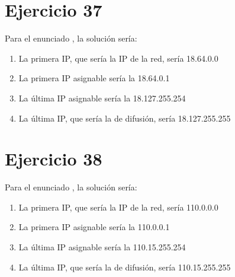 \documentclass[letterpaper,10pt,spanish]{sphinxmanual}
\begin{document}
\section{Ejercicio 37}
\label{\detokenize{t2_integracion_elementos/ejercicios_subredes_ipv4/rangos_direcciones:id37}}
\sphinxAtStartPar
Para el enunciado , la solución sería:
\begin{enumerate}
%
\item {} 
\sphinxAtStartPar
La primera IP, que sería la IP de la red, sería 18.64.0.0

\item {} 
\sphinxAtStartPar
La primera IP asignable sería la 18.64.0.1

\item {} 
\sphinxAtStartPar
La última IP asignable sería la 18.127.255.254

\item {} 
\sphinxAtStartPar
La última IP, que sería la de difusión, sería 18.127.255.255

\end{enumerate}


\section{Ejercicio 38}
\label{\detokenize{t2_integracion_elementos/ejercicios_subredes_ipv4/rangos_direcciones:id38}}
\sphinxAtStartPar
Para el enunciado , la solución sería:
\begin{enumerate}
%
\item {} 
\sphinxAtStartPar
La primera IP, que sería la IP de la red, sería 110.0.0.0

\item {} 
\sphinxAtStartPar
La primera IP asignable sería la 110.0.0.1

\item {} 
\sphinxAtStartPar
La última IP asignable sería la 110.15.255.254

\item {} 
\sphinxAtStartPar
La última IP, que sería la de difusión, sería 110.15.255.255

\end{enumerate}
\end{document}
